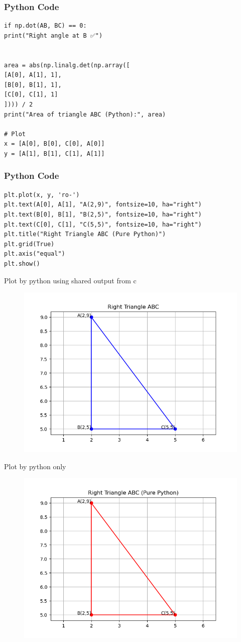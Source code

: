 \documentclass{beamer}
\begin{document}
\begin{frame}[fragile]
	\frametitle{Python Code}
	\begin{lstlisting}
if np.dot(AB, BC) == 0:
print("Right angle at B ✅")


area = abs(np.linalg.det(np.array([
[A[0], A[1], 1],
[B[0], B[1], 1],
[C[0], C[1], 1]
]))) / 2
print("Area of triangle ABC (Python):", area)

# Plot
x = [A[0], B[0], C[0], A[0]]
y = [A[1], B[1], C[1], A[1]]
	\end{lstlisting}
\end{frame}

\begin{frame}[fragile]
	\frametitle{Python Code}
	\begin{lstlisting}
plt.plot(x, y, 'ro-')
plt.text(A[0], A[1], "A(2,9)", fontsize=10, ha="right")
plt.text(B[0], B[1], "B(2,5)", fontsize=10, ha="right")
plt.text(C[0], C[1], "C(5,5)", fontsize=10, ha="right")
plt.title("Right Triangle ABC (Pure Python)")
plt.grid(True)
plt.axis("equal")
plt.show()
	\end{lstlisting}
\end{frame}

\begin{frame}{Plot by python using shared output from c}
	\begin{center}
	\begin{figure}[H]
		\centering
		\includegraphics[width = 0.6\columnwidth]{figs/Figure_1.png}
		\caption*{}
		\label{}
	\end{figure}
	\end{center}
\end{frame}

\begin{frame}{Plot by python only}
	\begin{center}
		\begin{figure}[H]
			\centering
			\includegraphics[width = 0.6\columnwidth]{figs/Figure_2.png}
			\caption*{}
			\label{}
		\end{figure}
	\end{center}
\end{frame}
\end{document}
